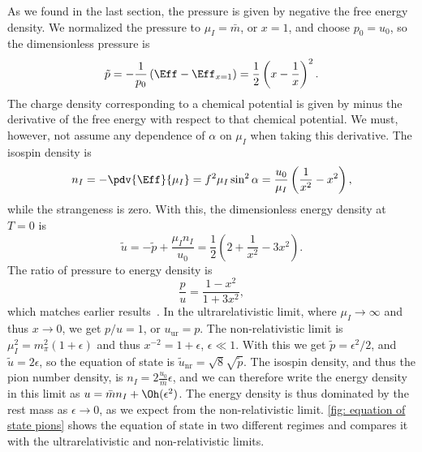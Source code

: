 \documentclass{book}
\begin{document}
As we found in the last section, the pressure is given by negative the free energy density. 
We normalized the pressure to $\mu_I = \bar m$, or $x = 1$, and choose $p_0 = u_0$, so the dimensionless pressure is
%
\begin{equation}
    \label{pressure leading order chpt}
    \tilde p = -\frac{1}{p_0} \left(\Eff - \Eff_{x=1}\right) 
    = \frac{1}{2} \left(x - \frac{1}{x}\right)^2.
\end{equation}
%
The charge density corresponding to a chemical potential is given by minus the derivative of the free energy with respect to that chemical potential. 
We must, however, not assume any dependence of $\alpha$ on $\mu_I$ when taking this derivative.
The isospin density is
%
\begin{equation}
    \label{isospin density}
    n_I = -\pdv{\Eff}{\mu_I} = f^2 \mu_I \sin^2 \alpha 
    = 
    \frac{u_0}{\mu_I} \left(\frac{1}{x^2} - x^2\right),
\end{equation}
%
while the strangeness is zero.
With this, the dimensionless energy density at $T = 0$ is
%
\begin{equation}
    \label{energy density leading order chpt}
    \tilde u = - \tilde p + \frac{\mu_I n_I}{u_0}
    = \frac{1}{2} \left( 2 + \frac{1}{x^2} - 3 x^2\right).
\end{equation}
%
The ratio of pressure to energy density is
%
\begin{equation} 
    \label{pressure energy ratio leading order chpt}
    \frac{p}{u} = \frac{1- x^2}{1+3x^2},
\end{equation}
%
which matches earlier results~\autocite{sonQCDFiniteIsospin2001}.
In the ultrarelativistic limit, where $\mu_I \rightarrow \infty$ and thus $x \rightarrow 0$, we get $p / u = 1$, or $u_\text{ur} = p$.
The non-relativistic limit is $\mu_I^2 = m_\pi^2(1 + \epsilon)$ and thus $x^{-2} = 1 + \epsilon$, $\epsilon \ll 1$.
With this we get $\tilde p = \epsilon^2 / 2 $, and $\tilde u = 2\epsilon$, so the equation of state is $\tilde u_\text{nr} = \sqrt 8 \sqrt{\tilde p}$.
The isospin density, and thus the pion number density, is $n_I = 2 \frac{u_0}{\bar m} \epsilon$, and we can therefore write the energy density in this limit as $u = \bar m n_I + \Oh(\epsilon^2)$.
The energy density is thus dominated by the rest mass as $\epsilon \rightarrow 0$, as we expect from the non-relativistic limit.
\autoref{fig: equation of state pions} shows the equation of state in two different regimes and compares it with the ultrarelativistic and non-relativistic limits.
\end{document}
